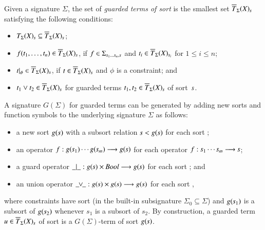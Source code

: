 \begin{definition}\label{def.guarded.guarded}
Given a signature $\Sigma$, the set of \emph{guarded terms of sort
} is the smallest set $\overline{T}_{\Sigma}(X)_{\textit{s}}$
satisfying the following conditions:

\begin{itemize}
	\item ${T}_{\Sigma}(X)_{\textit{s}} \subseteq \overline{T}_{\Sigma}(X)_{\textit{s}}$;
		
	\item $f(t_1,\ldots,t_n) \in \overline{T}_{\Sigma}(X)_{\textit{s}}$,
    if $f\in \Sigma_{\textit{s}_1\ldots \textit{s}_n, \textit{s}}$ and $t_i
    \in \overline{T}_{\Sigma}(X)_{\textit{s}_i}$ for $1 \leq i \leq n$;
	
	\item $t |_{\phi} \in \overline{T}_{\Sigma}(X)_{\textit{s}}$, if $t
    \in \overline{T}_{\Sigma}(X)_{\textit{s}}$ and $\phi$ is a
    constraint; and
	
	\item $t _1 \lor t_2 \in \overline{T}_{\Sigma}(X)_{\textit{s}}$ for
    guarded terms $t_1, t_2 \in \overline{T}_{\Sigma}(X)_{\textit{s}}$
    of sort~$\textit{s}$.
\end{itemize}
\end{definition}

A signature $G(\Sigma)$ for guarded terms can be generated by adding
new sorts and function symbols to the underlying signature $\Sigma$ as
follows:


\begin{itemize}
	\item a new sort $g(\textit{s})$ with a subsort relation $\textit{s} <
    g(\textit{s})$ for each sort ;
	
	\item an operator $f : g(\textit{s}_1) \cdots
    g(\textit{s}_m) \longrightarrow g(\textit{s})$ for each operator
    $f : \textit{s}_1 \cdots \textit{s}_m \longrightarrow \textit{s}$;

	\item a guard operator $\_|\_ : g(\textit{s}) \times
    \textit{Bool} \longrightarrow g(\textit{s})$ for each sort ; and

	\item an union operator $\_\!\!\vee\!\!\_ : g(\textit{s}) \times
    g(\textit{s}) \longrightarrow g(\textit{s})$ for each sort ,

\end{itemize}

\noindent
where constraints have sort  (in the built-in subsignature
$\Sigma_0 \subseteq \Sigma$) and $g(\textit{s}_1)$ is a subsort of
$g(\textit{s}_2)$ whenever $s_1$ is a subsort of $s_2$.
%
By construction, a guarded term $u \in
\overline{T}_{\Sigma}(X)_{\textit{s}}$ of sort  is a
$G(\Sigma)$-term of sort $g(\textit{s})$.


